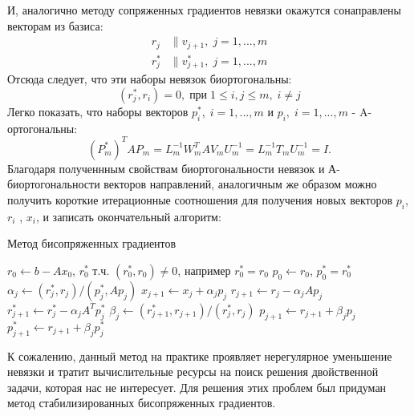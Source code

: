 И, аналогично методу сопряженных градиентов невязки окажутся сонаправлены векторам из базиса:
\begin{align*}
    r_j &\parallel v_{j+1},\;j=1,...,m \\
    r_j^* &\parallel v_{j+1}^*,\;j=1,...,m
\end{align*}
Отсюда следует, что эти наборы невязок биортогональны:
\begin{equation}
    \label{eq:rjrieq0}
    (r_j^*,r_i) = 0,\;\text{при}\;1 \leq i,j \leq m,\;i \neq j
\end{equation}
Легко показать, что наборы векторов $p_i^*,\;i=1,...,m$ и $p_i,\;i=1,...,m$ - A-ортогональны:
\begin{equation*}
    (P_m^*)^T A P_m = L_m^{-1} W_m^T A V_m U_m^{-1} = L_m^{-1} T_m U_m^{-1} = I.
\end{equation*}
Благодаря полученнным свойствам биортогональности невязок и А-биортогональности
векторов направлений, аналогичным же образом можно получить короткие итерационные соотношения для получения новых векторов 
$p_i$, $r_i$ , $x_i$, и записать окончательный алгоритм:
\begin{algorithm}[H]
    \caption{Метод бисопряженных градиентов}
    \begin{algorithmic}[1]
    \State $r_0 \gets b - A x_0$, $r_0^*$ т.ч. $(r_0^*,r_0) \neq 0$, например $r_0^*=r_0$ 
    \State $p_0 \gets r_0$, $p_0^*=r_0^*$
        \State $\alpha_j \gets (r_j^*, r_j) / (p_j^*, A p_j)$
        \State $x_{j+1} \gets x_j + \alpha_j p_j$
        \State $r_{j+1} \gets r_j - \alpha_j A p_j$
        \State $r_{j+1}^* \gets r_j^* - \alpha_j A^T p_j^*$
        \State $\beta_j \gets (r_{j+1}^*, r_{j+1}) / (r_j^*, r_j)$
        \State $p_{j+1} \gets r_{j+1} + \beta_j p_j$
        \State $p_{j+1}^* \gets r_{j+1} + \beta_j p_j^*$
    \EndFor
    \end{algorithmic}
\end{algorithm}
К сожалению, данный метод на практике проявляет нерегулярное уменьшение невязки и 
тратит вычислительные ресурсы на поиск решения двойственной задачи, которая нас не интересует.
Для решения этих проблем был придуман метод стабилизированных бисопряженных градиентов.

